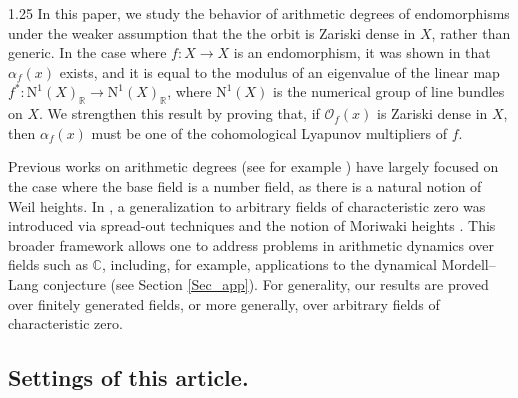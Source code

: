 \documentclass[12pt]{amsart}
\newcommand\mO{\mathcal{O}}
\newcommand\ra{\rightarrow}
\begin{document}
\begin{spacing}{1.25}
In this paper, we study the behavior of arithmetic degrees of endomorphisms under the weaker assumption that the the orbit is Zariski dense in $X$, rather than generic. In the case where $f: X\ra X$ is an endomorphism, it was shown in \cite{KS16} that $\alpha_f(x)$ exists, and it is equal to the modulus of an eigenvalue of the linear map $f^*:\mathrm{N}^1(X)_{\mathbb{R}}\rightarrow\mathrm{N}^1(X)_{\mathbb{R}}$, where $\mathrm{N}^1(X)$ is the numerical group of line bundles on $X$. We strengthen this result by proving that, if $\mO_f(x)$ is Zariski dense in $X$, then $\alpha_f(x)$ must be one of the cohomological Lyapunov multipliers of $f$.

Previous works on arithmetic degrees (see for example \cite{KS16,KS16C,Mat20}) have largely focused on the case where the base field is a number field, as there is a natural notion of Weil heights. In \cite{LS24}, a generalization to arbitrary fields of characteristic zero was introduced via spread-out techniques and the notion of Moriwaki heights \cite{Mor00}. This broader framework allows one to address problems in arithmetic dynamics over fields such as $\mathbb{C}$, including, for example, applications to the dynamical Mordell–Lang conjecture (see Section \ref{Sec_app}). For generality, our results are proved over finitely generated fields, or more generally, over arbitrary fields of characteristic zero.

\subsection*{Settings of this article.}

\ 


\end{spacing}
\end{document}
